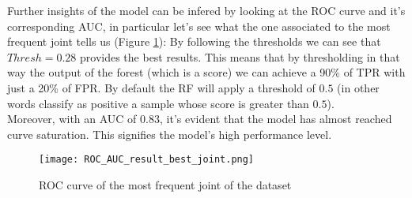Further insights of the model can be infered by looking at the ROC curve and it's corresponding AUC, in particular let's see what the one associated to the most frequent joint tells us (Figure \ref{fig:roc_auc_results}):
By following the thresholds we can see that $Thresh = 0.28$ provides the best results. This means that by thresholding in that way the output of the forest (which is a score) we can achieve a 90\% of TPR with just a 20\% of FPR.
By default the RF will apply a threshold of $0.5$ (in other words classify as positive a sample whose score is greater than $0.5$).\\

Moreover, with an AUC of $0.83$, it's evident that the model has almost reached curve saturation. This signifies the model's high performance level.

\begin{figure}
  \centering
  \texttt{[image: ROC\_AUC\_result\_best\_joint.png]}
  \caption{ROC curve of the most frequent joint of the dataset}
  \label{fig:roc_auc_results}
\end{figure}